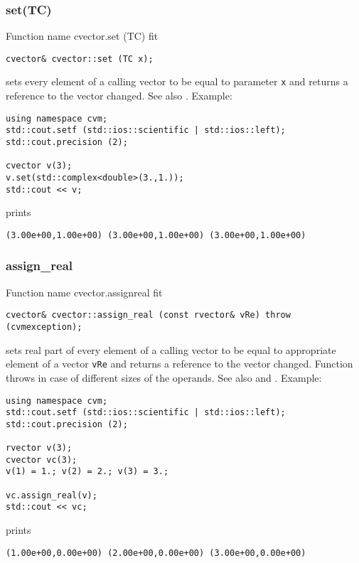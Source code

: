 \subsubsection{set(TC)}
Function%
\pdfdest name {cvector.set (TC)} fit
\begin{verbatim}
cvector& cvector::set (TC x);
\end{verbatim}
sets every element of a calling vector to be equal to
parameter \verb"x"
and returns a reference to the vector changed.
See also .
Example:
\begin{Verbatim}
using namespace cvm;
std::cout.setf (std::ios::scientific | std::ios::left);
std::cout.precision (2);

cvector v(3);
v.set(std::complex<double>(3.,1.));
std::cout << v;
\end{Verbatim}
prints
\begin{Verbatim}
(3.00e+00,1.00e+00) (3.00e+00,1.00e+00) (3.00e+00,1.00e+00)
\end{Verbatim}
\newpage



\subsubsection{assign\_real}
Function%
\pdfdest name {cvector.assignreal} fit
\begin{verbatim}
cvector& cvector::assign_real (const rvector& vRe) throw (cvmexception);
\end{verbatim}
sets real part of every element of a calling vector to be equal to
appropriate element of a vector \verb"vRe"
and returns a reference to
the vector changed.
Function throws  
in case of different sizes of the operands.
See also  and .
Example:
\begin{Verbatim}
using namespace cvm;
std::cout.setf (std::ios::scientific | std::ios::left);
std::cout.precision (2);

rvector v(3);
cvector vc(3);
v(1) = 1.; v(2) = 2.; v(3) = 3.;

vc.assign_real(v);
std::cout << vc;
\end{Verbatim}
prints
\begin{Verbatim}
(1.00e+00,0.00e+00) (2.00e+00,0.00e+00) (3.00e+00,0.00e+00)
\end{Verbatim}
\newpage


